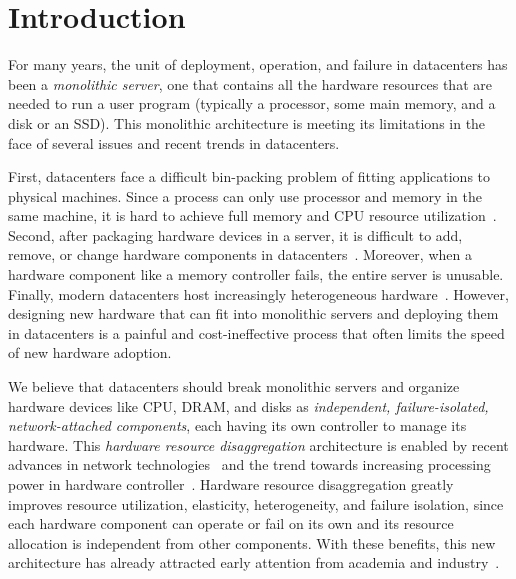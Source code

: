 \section{Introduction}
\label{sec:introduction}

For many years, the unit of deployment, operation, and failure in datacenters has been a {\em monolithic server},
one that contains all the hardware resources 
that are needed to run a user program
(typically a processor, some main memory, and a disk or an SSD).
This monolithic architecture is meeting its limitations in the face of 
several issues and recent trends in datacenters.

First, datacenters face a difficult bin-packing problem of fitting applications to physical machines.
Since a process can only use processor and memory in the same machine, 
it is hard to achieve full memory and CPU resource utilization~\cite{Barroso-COMPUTER,Quasar-ASPLOS,PowerNap}.
Second, after packaging hardware devices in a server, it is difficult to add, remove, or change 
hardware components in datacenters~\cite{FB-Wedge100}. 
Moreover, when a hardware component like a memory controller fails, the entire server is unusable.
Finally, modern datacenters host increasingly heterogeneous hardware~\cite{sigarch-dc,Putnam14-FPGA,TPU,DPU}.
However, designing new hardware that can fit into monolithic servers and deploying them in datacenters
is a painful and cost-ineffective process 
that often limits the speed of new hardware adoption. %

We believe that datacenters should break monolithic servers
and organize hardware devices like CPU, DRAM, and disks 
as {\em independent, failure-isolated, network-attached components},
each having its own controller to manage its hardware.
This {\em hardware resource disaggregation} architecture  
is enabled by recent advances in network technologies~\cite{IB-RTT,GenZ,Mellanox-ConnectX6-IB,OpenCAPI,Omni-Path,ccix} 
and the trend towards increasing processing power in hardware controller~\cite{Willow,Ahn15-PIM,Bojnordi12}.
Hardware resource disaggregation greatly improves resource utilization, elasticity, 
heterogeneity, and failure isolation,
since each hardware component can operate or fail on its own and its resource allocation is independent from other components.
With these benefits, this new architecture has already attracted early attention 
from academia and industry~\cite{OCP,HP-TheMachine,FireBox-FASTKeynote,Lim09-disaggregate,Nitu18-EUROSYS,dRedBox-DATE}.

